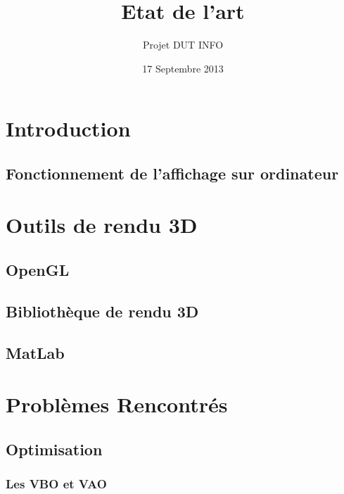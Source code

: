 \documentclass{report}
\title{Etat de l'art}
\author{Projet DUT INFO}
\date{17 Septembre 2013}
\begin{document}
\maketitle

\hypertarget{tableofcontents}{} %
\tableofcontents

\part{Introduction}

\chapter{Fonctionnement de l'affichage sur ordinateur}


\part{Outils de rendu 3D}

\chapter{OpenGL}


\chapter{Bibliothèque de rendu 3D}


\chapter{MatLab}

\part{Problèmes Rencontrés}

\chapter{Optimisation}
\section{Les VBO et VAO}


\newpage
\end{document}
